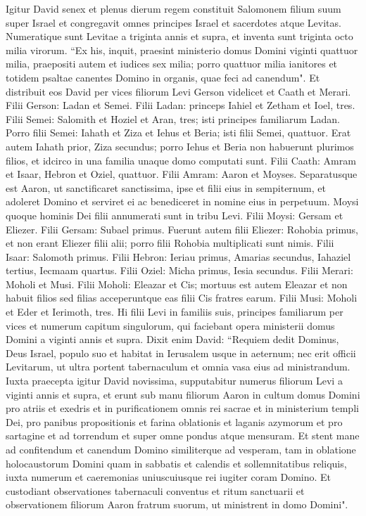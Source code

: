 \begin{biblechapter}  
\verse Igitur David senex et plenus dierum regem constituit Salomonem filium suum super Israel 
\verse et congregavit omnes principes Israel et sacerdotes atque Levitas. 
\verse Numeratique sunt Levitae a triginta annis et supra, et inventa sunt triginta octo milia virorum. 
\verse “Ex his, inquit, praesint ministerio domus Domini viginti quattuor milia, praepositi autem et iudices sex milia; 
\verse porro quattuor milia ianitores et totidem psaltae canentes Domino in organis, quae feci ad canendum". 
\verse Et distribuit eos David per vices filiorum Levi Gerson videlicet et Caath et Merari. 
\verse Filii Gerson: Ladan et Semei. 
\verse Filii Ladan: princeps Iahiel et Zetham et Ioel, tres. 
\verse Filii Semei: Salomith et Hoziel et Aran, tres; isti principes familiarum Ladan. 
\verse Porro filii Semei: Iahath et Ziza et Iehus et Beria; isti filii Semei, quattuor. 
\verse Erat autem Iahath prior, Ziza secundus; porro Iehus et Beria non habuerunt plurimos filios, et idcirco in una familia unaque domo computati sunt. 
\verse Filii Caath: Amram et Isaar, Hebron et Oziel, quattuor. 
\verse Filii Amram: Aaron et Moyses. Separatusque est Aaron, ut sanctificaret sanctissima, ipse et filii eius in sempiternum, et adoleret Domino et serviret ei ac benediceret in nomine eius in perpetuum. 
\verse Moysi quoque hominis Dei filii annumerati sunt in tribu Levi. 
\verse Filii Moysi: Gersam et Eliezer. 
\verse Filii Gersam: Subael primus. 
\verse Fuerunt autem filii Eliezer: Rohobia primus, et non erant Eliezer filii alii; porro filii Rohobia multiplicati sunt nimis. 
\verse Filii Isaar: Salomoth primus. 
\verse Filii Hebron: Ieriau primus, Amarias secundus, Iahaziel tertius, Iecmaam quartus. 
\verse Filii Oziel: Micha primus, Iesia secundus. 
\verse Filii Merari: Moholi et Musi. Filii Moholi: Eleazar et Cis; 
\verse mortuus est autem Eleazar et non habuit filios sed filias acceperuntque eas filii Cis fratres earum. 
\verse Filii Musi: Moholi et Eder et Ierimoth, tres. 
\verse Hi filii Levi in familiis suis, principes familiarum per vices et numerum capitum singulorum, qui faciebant opera ministerii domus Domini a viginti annis et supra. 
\verse Dixit enim David: “Requiem dedit Dominus, Deus Israel, populo suo et habitat in Ierusalem usque in aeternum; 
\verse nec erit officii Levitarum, ut ultra portent tabernaculum et omnia vasa eius ad ministrandum. 
\verse Iuxta praecepta igitur David novissima, supputabitur numerus filiorum Levi a viginti annis et supra, 
\verse et erunt sub manu filiorum Aaron in cultum domus Domini pro atriis et exedris et in purificationem omnis rei sacrae et in ministerium templi Dei,  
\verse pro panibus propositionis et farina oblationis et laganis azymorum et pro sartagine et ad torrendum et super omne pondus atque mensuram. 
\verse Et stent mane ad confitendum et canendum Domino similiterque ad vesperam, 
\verse tam in oblatione holocaustorum Domini quam in sabbatis et calendis et sollemnitatibus reliquis, iuxta numerum et caeremonias uniuscuiusque rei iugiter coram Domino.  
\verse Et custodiant observationes tabernaculi conventus et ritum sanctuarii et observationem filiorum Aaron fratrum suorum, ut ministrent in domo Domini". 
\end{biblechapter}


